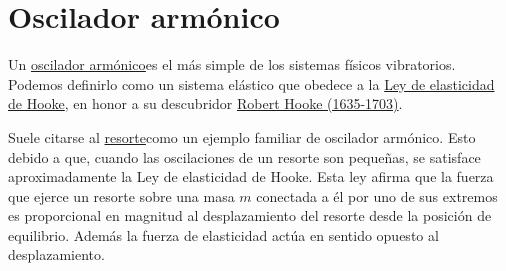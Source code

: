 \section{Oscilador armónico}\label{resortito}




Un \href{http://es.wikipedia.org/wiki/Oscilador_armónico}{oscilador armónico}\link es el más simple de los sistemas físicos vibratorios. Podemos definirlo como un sistema
elástico que obedece a la \href{http://es.wikipedia.org/wiki/Ley_de_Hooke}{Ley de elasticidad de Hooke}\link, en honor a su descubridor
\href{http://es.wikipedia.org/wiki/Robert_Hooke}{Robert Hooke (1635-1703)}\link.

Suele citarse al \href{http://es.wikipedia.org/wiki/Resorte}{resorte}\link como un ejemplo familiar de oscilador armónico. Esto debido a que, cuando las oscilaciones de un resorte son
pequeñas,  se satisface aproximadamente la Ley de elasticidad de  Hooke. Esta ley  afirma que la fuerza que ejerce un resorte sobre una masa $m$ conectada a él por uno
de sus extremos es proporcional en magnitud al desplazamiento
del resorte desde la posición de equilibrio. Además la fuerza de elasticidad actúa en sentido opuesto al desplazamiento.

